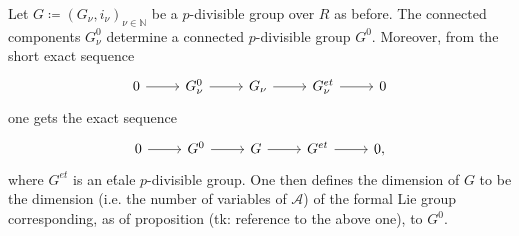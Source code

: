 \documentclass[../Main]{subfiles}
\begin{document}
\begin{defn}
	Let $G \coloneqq \left(G_{\nu}, i_\nu\right)_{\nu \in \mathbb{N}}$ be a $p$-divisible group
	over $R$ as before.
	The connected components $G^0_\nu$ determine a connected $p$-divisible
	group $G^0$.
	Moreover, from the short exact sequence
	\begin{equation}
	\begin{tikzcd}
		0 \arrow[r, "", rightarrow] &
		G^0_\nu \arrow[r, "", rightarrow] &
		G_\nu \arrow[r, "", rightarrow] &
		G^{et}_\nu \arrow[r, "", rightarrow] &
		0
	\end{tikzcd}
	\end{equation}
	one gets the exact sequence
	\begin{equation}
	\begin{tikzcd}
		0 \arrow[r, "", rightarrow] &
		G^0 \arrow[r, "", rightarrow] &
		G \arrow[r, "", rightarrow] &
		G^{et} \arrow[r, "", rightarrow] &
		0
	,\end{tikzcd}
	\end{equation}
	where $G^{et}$ is an e\'tale $p$-divisible group.
	One then defines the dimension of $G$ to be the dimension 
	(i.e. the number of variables of $\mathscr{A}$)
	of the formal Lie group corresponding, as of proposition (tk: reference to the above one),
	to $G^0$.
\end{defn}
\end{document}
